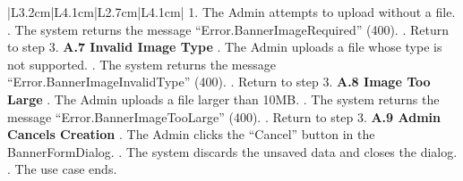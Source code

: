 \begin{longtable}{|L{3.2cm}|L{4.1cm}|L{2.7cm}|L{4.1cm}|}
{1. The Admin attempts to upload without a file. . The system returns the message ``Error.BannerImageRequired'' (400). . Return to step 3. \newline
\textbf{A.7 Invalid Image Type} . The Admin uploads a file whose type is not supported. . The system returns the message ``Error.BannerImageInvalidType'' (400). . Return to step 3. \newline
\textbf{A.8 Image Too Large} . The Admin uploads a file larger than 10MB. . The system returns the message ``Error.BannerImageTooLarge'' (400). . Return to step 3. \newline
\textbf{A.9 Admin Cancels Creation} . The Admin clicks the ``Cancel'' button in the BannerFormDialog. . The system discards the unsaved data and closes the dialog. . The use case ends.
} \\ \hline


\end{longtable}
